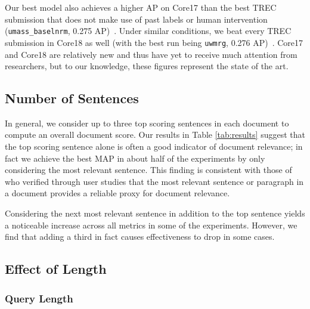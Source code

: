 Our best model also achieves a higher AP on Core17 than the best TREC submission that does not make use of past labels or human intervention (\texttt{umass\_baselnrm}, 0.275 AP)~\cite{core2017trec}.
Under similar conditions, we beat every TREC submission in Core18 as well (with the best run being \texttt{uwmrg}, 0.276 AP)~\cite{core2018trec}.
Core17 and Core18 are relatively new and thus have yet to receive much attention from researchers, but to our knowledge, these figures represent the state of the art.

\subsection{Number of Sentences}

In general, we consider up to three top scoring sentences in each document to compute an overall document score.
Our results in Table \ref{tab:results} suggest that the top scoring sentence alone is often a good indicator of document relevance; in fact we achieve the best MAP in about half of the experiments by only considering the most relevant sentence.
This finding is consistent with those of \cite{zhang2018effective} who verified through user studies that the most relevant sentence or paragraph in a document provides a reliable proxy for document relevance.

Considering the next most relevant sentence in addition to the top sentence yields a noticeable increase across all metrics in some of the experiments.
However, we find that adding a third in fact causes effectiveness to drop in some cases.

\subsection{Effect of Length}

\subsubsection{Query Length}

